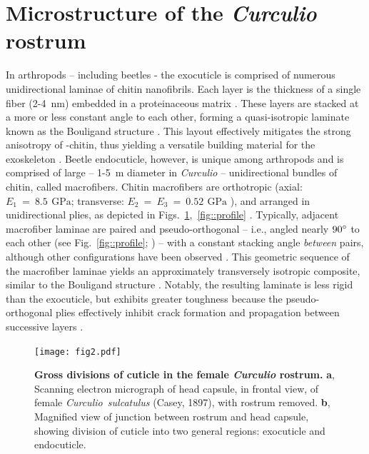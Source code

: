 \documentclass[twocolumn, linenumbers, superscriptaddress, nofootinbib]{revtex4-1}
\begin{document}
	\section{Microstructure of the \textit{Curculio} rostrum}
		In arthropods -- including beetles - the exocuticle is comprised of numerous unidirectional laminae of chitin nanofibrils.
		Each layer is the thickness of a single fiber (2-4 \,nm) embedded in a proteinaceous matrix \cite{Nikolov2010, Nikolov2011}.
		These layers are stacked at a more or less constant angle to each other, forming a quasi-isotropic laminate known as the Bouligand structure \cite{Blackwell1980, Bouligand1972, Neville1976}. 
		This layout effectively mitigates the strong anisotropy of \textalpha-chitin, thus yielding a versatile building material for the exoskeleton \cite{Vincent1982, Vincent2004, Nikolov2010, Nikolov2011}.		
		Beetle endocuticle, however, is unique among arthropods and is comprised of large -- 1-5 \,{\textmu}m diameter in \textit{Curculio} -- unidirectional bundles of chitin, called macrofibers.
		Chitin macrofibers are orthotropic (axial: $E_1~=~8.5~\,\text{GPa}$; transverse: $ E_2~=~E_3~=~0.52~\,\text{GPa}$ \cite{Jansen2016}), and arranged in unidirectional plies, as depicted in Figs.~\ref{fig::cuticle},~\ref{fig::profile} \cite{Kamp2010, Kamp2015}.
		Typically, adjacent macrofiber laminae are paired and pseudo-orthogonal -- i.e., angled nearly $90\degree$ to each other (see Fig.~\ref{fig::profile}; \cite{Cheng2009}) -- with a constant stacking angle \emph{between} pairs, although other configurations have been observed \cite{Hepburn1973, Kamp2010, Kamp2015, Leopold1992}.
		This geometric sequence of the macrofiber laminae yields an approximately transversely isotropic composite, similar to the Bouligand structure \cite{Kamp2015, Nikolov2010}.
		Notably, the resulting laminate is less rigid than the exocuticle, but exhibits greater toughness because the pseudo-orthogonal plies effectively inhibit crack formation and propagation between successive layers \cite{Kamp2010, Kamp2015, Hepburn1973}.
		
		\begin{figure}
			\centering
			\texttt{[image: fig2.pdf]}
			\caption{\textbf{Gross divisions of cuticle in the female \textit{Curculio} rostrum.}
				\textbf{a}, Scanning electron micrograph of head capsule, in frontal view, of female \textit{Curculio~sulcatulus} (Casey, 1897), with rostrum removed.
				\textbf{b}, Magnified view of junction between rostrum and head capsule, showing division of cuticle into two general regions: exocuticle and endocuticle.
			}
			\label{fig::cuticle}
		\end{figure}
		
\end{document}
